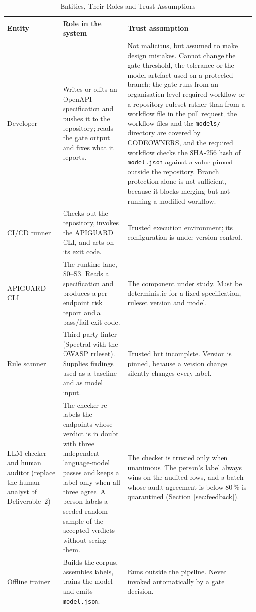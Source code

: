\documentclass[conference]{IEEEtran}
\begin{document}
\begin{table}[!t]
\caption{Entities, Their Roles and Trust Assumptions}
\label{tab:entities}
\centering
\footnotesize
\begin{tabularx}{\textwidth}{L{2.4cm} Y Y}
\toprule
\textbf{Entity} & \textbf{Role in the system} & \textbf{Trust assumption}\\
\midrule
Developer & Writes or edits an OpenAPI specification and pushes it to the repository; reads
the gate output and fixes what it reports. & Not malicious, but assumed to make design
mistakes. Cannot change the gate threshold, the tolerance or the model artefact used on a
protected branch: the gate runs from an organisation-level required workflow or a repository
ruleset rather than from a workflow file in the pull request, the workflow files and the
\texttt{models/} directory are covered by CODEOWNERS, and the required workflow checks the
SHA-256 hash of \texttt{model.json} against a value pinned outside the repository. Branch
protection alone is not sufficient, because it blocks merging but not running a modified
workflow.\\
CI/CD runner & Checks out the repository, invokes the APIGUARD CLI, and acts on its exit
code. & Trusted execution environment; its configuration is under version control.\\
APIGUARD CLI & The runtime lane, S0--S3. Reads a specification and produces a per-endpoint
risk report and a pass/fail exit code. & The component under study. Must be deterministic
for a fixed specification, ruleset version and model.\\
Rule scanner & Third-party linter (Spectral with the OWASP ruleset). Supplies findings used
as a baseline and as model input. & Trusted but incomplete. Version is pinned, because a
version change silently changes every label.\\
LLM checker and human auditor (replace the human analyst of Deliverable~2) & The checker re-labels the endpoints whose verdict is in doubt with three independent language-model passes and keeps a label only when all three agree. A person labels a seeded random sample of the accepted verdicts without seeing them. & The checker is trusted only when unanimous. The person's label always wins on the audited rows, and a batch whose audit agreement is below 80\,\% is quarantined (Section~\ref{sec:feedback}).\\
Offline trainer & Builds the corpus, assembles labels, trains the model and emits
\texttt{model.json}. & Runs outside the pipeline. Never invoked automatically by a gate
decision.\\
\bottomrule
\end{tabularx}
\end{table}
\end{document}
